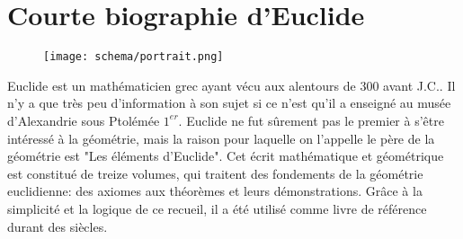 \documentclass[a4paper,12pt]{article}
\begin{document}
\section{Courte biographie d'Euclide}

\begin{figure}[H]
    \centering
    \texttt{[image: schema/portrait.png]}
\end{figure}
Euclide est un mathématicien grec ayant vécu aux alentours de 300 avant J.C.. Il n'y a que très peu d'information à son sujet si ce n'est qu'il a enseigné au musée d'Alexandrie sous Ptolémée $1^{er}$. Euclide ne fut sûrement pas le premier à s'être intéressé à la géométrie, mais la raison pour laquelle on l'appelle le père de la géométrie est "Les éléments d'Euclide". Cet écrit mathématique et géométrique est constitué de treize volumes, qui traitent des fondements de la géométrie euclidienne: des axiomes aux théorèmes et leurs démonstrations. Grâce à la simplicité et la logique de ce recueil, il a été utilisé comme livre de référence durant des siècles.
\end{document}
